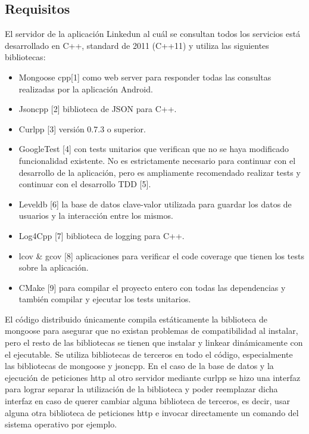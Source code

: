 \documentclass[a4paper,10pt,spanish]{sphinxmanual}
\begin{document}
\subsection{Requisitos}
\label{docTecnica:requisitos}
El servidor de la aplicación Linkedun al cuál se consultan todos los servicios está desarrollado en C++, standard de 2011 (C++11) y utiliza las siguientes bibliotecas:
\begin{itemize}
\item {} 
Mongoose cpp{[}1{]} como web server para responder todas las consultas realizadas por la aplicación Android.

\item {} 
Jsoncpp {[}2{]} biblioteca de JSON para C++.

\item {} 
Curlpp {[}3{]} versión 0.7.3 o superior.

\item {} 
GoogleTest {[}4{]} con tests unitarios que verifican que no se haya modificado funcionalidad existente. No es estrictamente necesario para continuar con el desarrollo de la aplicación, pero es ampliamente recomendado realizar tests y continuar con el desarrollo TDD {[}5{]}.

\item {} 
Leveldb {[}6{]} la base de datos clave-valor utilizada para guardar los datos de usuarios y la interacción entre los mismos.

\item {} 
Log4Cpp {[}7{]} biblioteca de logging para C++.

\item {} 
lcov \& gcov {[}8{]} aplicaciones para verificar el code coverage que tienen los tests sobre la aplicación.

\item {} 
CMake {[}9{]} para compilar el proyecto entero con todas las dependencias y también compilar y ejecutar los tests unitarios.

\end{itemize}

El código distribuido únicamente compila estáticamente la biblioteca de mongoose para asegurar que no existan problemas de compatibilidad al instalar, pero el resto de las bibliotecas se tienen que instalar y linkear dinámicamente con el ejecutable.
Se utiliza bibliotecas de terceros en todo el código, especialmente las bibliotecas de mongoose y jsoncpp. En el caso de la base de datos y la ejecución de peticiones http al otro servidor mediante curlpp se hizo una interfaz para lograr separar la utilización de la biblioteca y poder reemplazar dicha interfaz en caso de querer cambiar alguna biblioteca de terceros, es decir, usar alguna otra biblioteca de peticiones http e invocar directamente un comando del sistema operativo por ejemplo.
\end{document}
